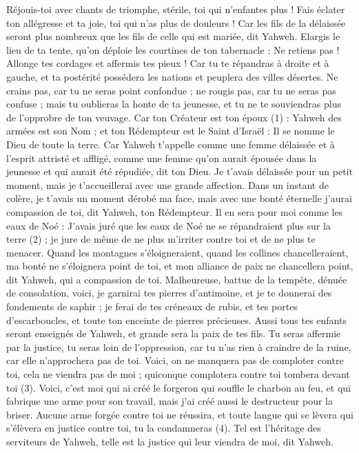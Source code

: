 \begin{multicols}{2}
\VerseOne{}Réjouis-toi avec chants de triomphe, stérile, toi qui n’enfantes plus ! Fais éclater ton allégresse et ta joie, toi qui n’as plus de douleurs ! Car les fils de la délaissée seront plus nombreux que les fils de celle qui est mariée, dit Yahweh.
Elargis le lieu de ta tente, qu'on déploie les courtines de ton tabernacle : Ne retiens pas ! Allonge tes cordages et affermis tes pieux !
Car tu te répandras à droite et à gauche, et ta postérité possédera les nations et peuplera des villes désertes.
Ne crains pas, car tu ne seras point confondue ; ne rougis pas, car tu ne seras pas confuse ; mais tu oublieras la honte de ta jeunesse, et tu ne te souviendras plus de l'opprobre de ton veuvage.
Car ton Créateur est ton époux (1) : Yahweh des armées est son Nom ; et ton Rédempteur est le Saint d'Israël : Il se nomme le Dieu de toute la terre.
Car Yahweh t’appelle comme une femme délaissée et à l’esprit attristé et affligé, comme une femme qu'on aurait épousée dans la jeunesse et qui aurait été répudiée, dit ton Dieu.
Je t’avais délaissée pour un petit moment, mais je t’accueillerai avec une grande affection.
Dans un instant de colère, je t’avais un moment dérobé ma face, mais avec une bonté éternelle j’aurai compassion de toi, dit Yahweh, ton Rédempteur.
Il en sera pour moi comme les eaux de Noé : J’avais juré que les eaux de Noé ne se répandraient plus sur la terre (2) ; je jure de même de ne plus m’irriter contre toi et de ne plus te menacer.
Quand les montagnes s’éloigneraient, quand les collines chancelleraient, ma bonté ne s’éloignera point de toi, et mon alliance de paix ne chancellera point, dit Yahweh, qui a compassion de toi.
Malheureuse, battue de la tempête, dénuée de consolation, voici, je garnirai tes pierres d’antimoine, et je te donnerai des fondements de saphir ;
je ferai de tes créneaux de rubis, et tes portes d’escarboucles, et toute ton enceinte de pierres précieuses.
Aussi tous tes enfants seront enseignés de Yahweh, et grande sera la paix de tes fils.
Tu seras affermie par la justice, tu seras loin de l'oppression, car tu n’as rien à craindre de la ruine, car elle n’approchera pas de toi.
Voici, on ne manquera pas de comploter contre toi, cela ne viendra pas de moi ; quiconque complotera contre toi tombera devant toi (3).
Voici, c'est moi qui ai créé le forgeron qui souffle le charbon au feu, et qui fabrique une arme pour son travail, mais j’ai créé aussi le destructeur pour la briser.
Aucune arme forgée contre toi ne réussira, et toute langue qui se lèvera qui s’élèvera en justice contre toi, tu la condamneras (4). Tel est l'héritage des serviteurs de Yahweh, telle est la justice qui leur viendra de moi, dit Yahweh.

\end{multicols}
